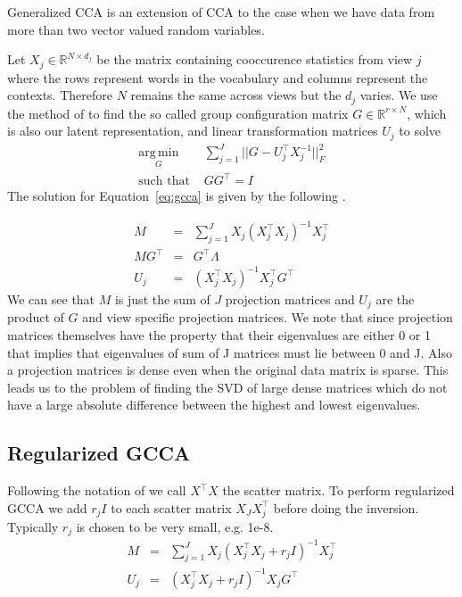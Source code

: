 \documentclass[11pt]{article}
\begin{document}
Generalized CCA
\cite{kettenring1971canonical,carroll1968generalization} is an
extension of CCA to the case when we have data from more than two
vector valued random variables. 

Let $X_j \in \mathbb{R}^{N\times d_j}$ be the matrix containing cooccurence statistics from view
$j$ where the rows represent words in the vocabulary and columns
represent the contexts. Therefore $N$ remains the
same across views but the $d_j$ varies.
We use the method of \cite{carroll1968generalization} to find the
so called group configuration matrix $G \in \mathbb{R}^{r\times N}$, which is also our latent
representation, and linear transformation matrices $U_j$ to solve
\begin{equation}
  \label{eq:gcca}
\begin{split}
  \operatorname*{arg\,min}_G & \sum_{j=1}^J ||G - U_j^\top X_j^{-1}||^2_F \\
  \text{such that } & G G^\top = I 
\end{split}
\end{equation}
The solution for Equation~\ref{eq:gcca} is given by the following \cite{carroll1968generalization}.

\begin{eqnarray}
M &=& \sum_{j=1}^J X_j(X_j^\top X_j)^{-1}X_j^\top\\
M G^\top &=& G^\top \Lambda\\
U_j &=& \left(X_j^\top X_j\right)^{-1} X_j^\top G^\top
\end{eqnarray}
We can see that $M$ is just the sum of $J$ projection matrices and
$U_j$ are the product of $G$ and view specific projection matrices.
We note that since projection matrices themselves have the property
that their eigenvalues are either 0 or 1 that implies
that eigenvalues of sum of J matrices must lie between 0 and J.
Also a projection matrices is dense even when the original data matrix
is sparse. This leads us to the problem of finding the SVD of large
dense matrices which do not have a large absolute difference between
the highest and lowest eigenvalues.

\subsection{Regularized GCCA}
Following the notation of \cite{hastie2009elements} we call $X^\top X$
the scatter matrix. To perform regularized GCCA we add $r_jI$ to each
scatter matrix $X_J X_j^\top$ before doing the inversion. Typically
$r_j$ is chosen to be very small, e.g. 1e-8.
\begin{eqnarray}
M &=& \sum_{j=1}^J X_j(X_j^\top X_j+r_jI)^{-1}X_j^\top \\
U_j &=& (X_j^\top X_j+r_jI)^{-1} X_jG^\top
\end{eqnarray}
\end{document}
